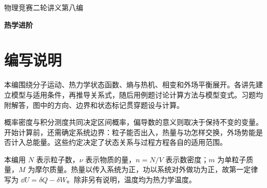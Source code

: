 \documentclass[UTF8,11pt,twoside,openany]{ctexbook}
\begin{document}
\frontmatter
\begin{titlepage}\centering\vspace*{28mm}
{\Large 物理竞赛二轮讲义\quad 第八编\par}\vspace{8mm}
{\Huge\bfseries 热学进阶\par}\vspace{12mm}{\Large 物理竞赛二轮讲义\par}\vspace{20mm}{\large 分子分布\quad 热力学关系\quad 熵与热机\quad 相变与外场\par}\vfill\end{titlepage}
\chapter*{编写说明}
本编围绕分子运动、热力学状态函数、熵与热机、相变和外场平衡展开。各讲先建立模型与适用条件，再推导关系式，随后用例题讨论计算方法与模型变式。习题均附解答，图中的方向、边界和状态标记贯穿题设与计算。

概率密度与积分测度共同决定区间概率，偏导数的意义则取决于保持不变的变量。开始计算前，还需确定系统边界：粒子能否出入，热量与功怎样交换，外场势能是否计入总能量。这些约定决定了状态关系与过程方程各自的适用范围。

本编用 $N$ 表示粒子数，$\nu$ 表示物质的量，$n=N/V$ 表示数密度；$m$ 为单粒子质量，$M$ 为摩尔质量。热量以传入系统为正，功以系统对外做功为正，故第一定律写为 $\dd U=\delta Q-\delta W$。除非另有说明，温度均为热力学温度。
\tableofcontents
\mainmatter




\end{document}
